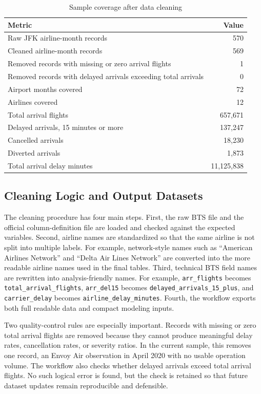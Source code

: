 \documentclass[11pt]{article}
\numberwithin{figure}{section}
\numberwithin{table}{section}
\begin{document}
\begin{table}[H]
\centering
\caption{Sample coverage after data cleaning}
\label{tab:sample-coverage}
\begin{tabular}{lr}
\toprule
Metric & Value \\
\midrule
Raw JFK airline-month records & 570 \\
Cleaned airline-month records & 569 \\
Removed records with missing or zero arrival flights & 1 \\
Removed records with delayed arrivals exceeding total arrivals & 0 \\
Airport months covered & 72 \\
Airlines covered & 12 \\
Total arrival flights & 657,671 \\
Delayed arrivals, 15 minutes or more & 137,247 \\
Cancelled arrivals & 18,230 \\
Diverted arrivals & 1,873 \\
Total arrival delay minutes & 11,125,838 \\
\bottomrule
\end{tabular}
\end{table}

\subsection{Cleaning Logic and Output Datasets}

The cleaning procedure has four main steps. First, the raw BTS file and the official column-definition file are loaded and checked against the expected variables. Second, airline names are standardized so that the same airline is not split into multiple labels. For example, network-style names such as ``American Airlines Network'' and ``Delta Air Lines Network'' are converted into the more readable airline names used in the final tables. Third, technical BTS field names are rewritten into analysis-friendly names. For example, \texttt{arr\_flights} becomes \texttt{total\_arrival\_flights}, \texttt{arr\_del15} becomes \texttt{delayed\_arrivals\_15\_plus}, and \texttt{carrier\_delay} becomes \texttt{airline\_delay\_minutes}. Fourth, the workflow exports both full readable data and compact modeling inputs.

Two quality-control rules are especially important. Records with missing or zero total arrival flights are removed because they cannot produce meaningful delay rates, cancellation rates, or severity ratios. In the current sample, this removes one record, an Envoy Air observation in April 2020 with no usable operation volume. The workflow also checks whether delayed arrivals exceed total arrival flights. No such logical error is found, but the check is retained so that future dataset updates remain reproducible and defensible.
\end{document}
